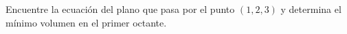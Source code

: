 \item Encuentre la ecuación del plano que pasa por el punto $(1, 2, 3)$ y determina el mínimo volumen en el primer octante.
